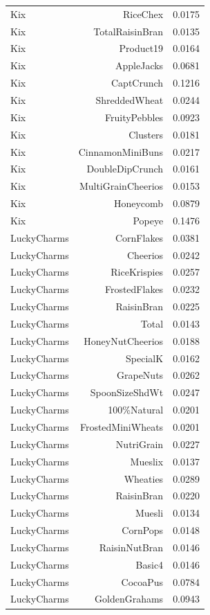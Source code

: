 \begin{longtable}{@{}lrr@{}}
Kix & RiceChex & 0.0175 \\
Kix & TotalRaisinBran & 0.0135 \\
Kix & Product19 & 0.0164 \\
Kix & AppleJacks & 0.0681 \\
Kix & CaptCrunch & 0.1216 \\
Kix & ShreddedWheat & 0.0244 \\
Kix & FruityPebbles & 0.0923 \\
Kix & Clusters & 0.0181 \\
Kix & CinnamonMiniBuns & 0.0217 \\
Kix & DoubleDipCrunch & 0.0161 \\
Kix & MultiGrainCheerios & 0.0153 \\
Kix & Honeycomb & 0.0879 \\
Kix & Popeye & 0.1476 \\
LuckyCharms & CornFlakes & 0.0381 \\
LuckyCharms & Cheerios & 0.0242 \\
LuckyCharms & RiceKrispies & 0.0257 \\
LuckyCharms & FrostedFlakes & 0.0232 \\
LuckyCharms & RaisinBran & 0.0225 \\
LuckyCharms & Total & 0.0143 \\
LuckyCharms & HoneyNutCheerios & 0.0188 \\
LuckyCharms & SpecialK & 0.0162 \\
LuckyCharms & GrapeNuts & 0.0262 \\
LuckyCharms & SpoonSizeShdWt & 0.0247 \\
LuckyCharms & 100\%Natural & 0.0201 \\
LuckyCharms & FrostedMiniWheats & 0.0201 \\
LuckyCharms & NutriGrain & 0.0227 \\
LuckyCharms & Mueslix & 0.0137 \\
LuckyCharms & Wheaties & 0.0289 \\
LuckyCharms & RaisinBran & 0.0220 \\
LuckyCharms & Muesli & 0.0134 \\
LuckyCharms & CornPops & 0.0148 \\
LuckyCharms & RaisinNutBran & 0.0146 \\
LuckyCharms & Basic4 & 0.0146 \\
LuckyCharms & CocoaPus & 0.0784 \\
LuckyCharms & GoldenGrahams & 0.0943 \\

\end{longtable}
